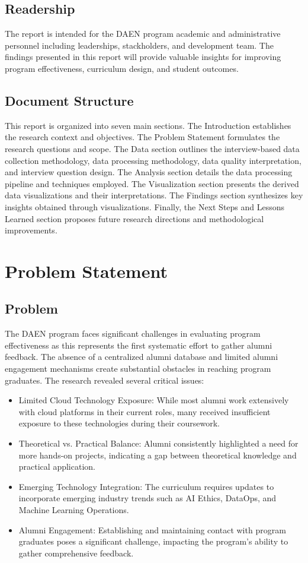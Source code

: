 \documentclass[12pt,a4paper]{article}
\begin{document}
\subsection{Readership}
The report is intended for the DAEN program academic and 
administrative personnel including leaderships, stackholders, 
and development team. The findings presented in this report will provide valuable insights for improving program effectiveness, curriculum design, and student outcomes.

\subsection{Document Structure}
This report is organized into seven main sections. The Introduction 
establishes the research context and objectives. The Problem 
Statement formulates the research questions and scope. 
The Data section outlines the interview-based data collection 
methodology, data processing methodology, data quality interpretation, and interview question design. The Analysis section details the data 
processing pipeline and techniques employed. The Visualization section presents the derived data visualizations 
and their interpretations. The Findings section synthesizes key 
insights obtained through visualizations. Finally, the Next 
Steps and Lessons Learned section proposes future research 
directions and methodological improvements.

\newpage

\section{Problem Statement}
\subsection{Problem}
The DAEN program faces significant challenges in evaluating program effectiveness as this represents the first systematic effort to gather alumni feedback. The absence of a centralized alumni database and limited alumni engagement mechanisms create substantial obstacles in reaching program graduates. The research revealed several critical issues:
\begin{itemize}
\item Limited Cloud Technology Exposure: While most alumni work extensively with cloud platforms in their current roles, many received insufficient exposure to these technologies during their coursework.
\item Theoretical vs. Practical Balance: Alumni consistently highlighted a need for more hands-on projects, indicating a gap between theoretical knowledge and practical application.
\item Emerging Technology Integration: The curriculum requires updates to incorporate emerging industry trends such as AI Ethics, DataOps, and Machine Learning Operations.
\item Alumni Engagement: Establishing and maintaining contact with program graduates poses a significant challenge, impacting the program's ability to gather comprehensive feedback.
\end{itemize}
\end{document}
